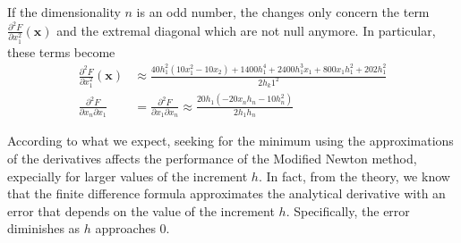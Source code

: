 If the dimensionality $n$ is an odd number, the changes only concern the term  $\frac{\partial^2 F}{\partial x_1^2} (\mathbf{x})$ and the extremal diagonal which are not null anymore. In particular, these terms become
\begin{align*}
    \frac{\partial^2 F}{\partial x_1^2} (\mathbf{x}) & \approx\frac{40h_1^2 (10x_1^2 - 10x_{2}) + 1400 h_1^4 + 2400h_1^3 x_1 + 800 x_1 h_1^2 + 202h_1^2 }{2 h_k1^2} \\
    \frac{\partial^2 F}{ \partial x_n \partial x_1} & = \frac{\partial^2 F}{ \partial x_1 \partial x_n} \approx \frac{20h_1(-20x_n h_n - 10h_n^2 )}{2h_1 h_n}
\end{align*}


According to what we expect, seeking for the minimum using the approximations of the derivatives affects the performance of the Modified Newton method, expecially for larger values of the increment $h$. 
In fact, from the theory, we know that the finite difference formula approximates the analytical derivative with an error that depends on the value of the increment $h$. Specifically, the error diminishes as $h$ approaches $0$.

